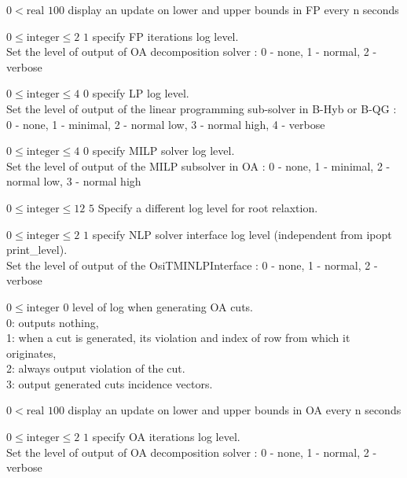 %
{$0<\textrm{real}$}%
{$100$}%
{display an update on lower and upper bounds in FP every n seconds}%
{}

%
{$0\leq\textrm{integer}\leq2$}%
{$1$}%
{specify FP iterations log level.\\
Set the level of output of OA decomposition solver : 0 - none, 1 - normal, 2 - verbose}%
{}

%
{$0\leq\textrm{integer}\leq4$}%
{$0$}%
{specify LP log level.\\
Set the level of output of the linear programming sub-solver in B-Hyb or B-QG : 0 - none, 1 - minimal, 2 - normal low, 3 - normal high, 4 - verbose}%
{}

%
{$0\leq\textrm{integer}\leq4$}%
{$0$}%
{specify MILP solver log level.\\
Set the level of output of the MILP subsolver in OA : 0 - none, 1 - minimal, 2 - normal low, 3 - normal high}%
{}

%
{$0\leq\textrm{integer}\leq12$}%
{$5$}%
{ Specify a different log level for root relaxtion.}%
{}

%
{$0\leq\textrm{integer}\leq2$}%
{$1$}%
{specify NLP solver interface log level (independent from ipopt print\_level).\\
Set the level of output of the OsiTMINLPInterface : 0 - none, 1 - normal, 2 - verbose}%
{}

%
{$0\leq\textrm{integer}$}%
{$0$}%
{level of log when generating OA cuts.\\
0: outputs nothing,\\1: when a cut is generated, its violation and index of row from which it originates,\\2: always output violation of the cut.\\3: output generated cuts incidence vectors.}%
{}

%
{$0<\textrm{real}$}%
{$100$}%
{display an update on lower and upper bounds in OA every n seconds}%
{}

%
{$0\leq\textrm{integer}\leq2$}%
{$1$}%
{specify OA iterations log level.\\
Set the level of output of OA decomposition solver : 0 - none, 1 - normal, 2 - verbose}%
{}

